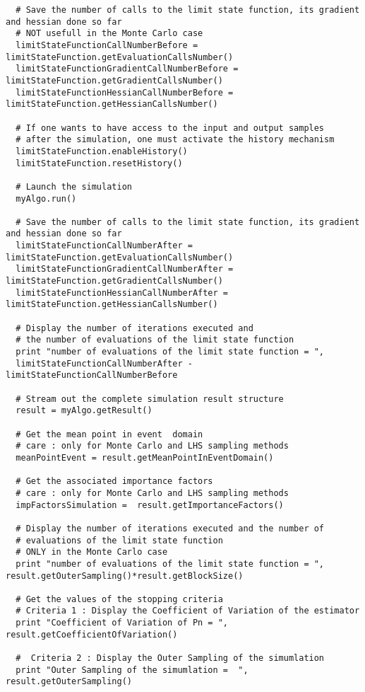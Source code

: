 \begin{lstlisting}
  # Save the number of calls to the limit state function, its gradient and hessian done so far
  # NOT usefull in the Monte Carlo case
  limitStateFunctionCallNumberBefore = limitStateFunction.getEvaluationCallsNumber()
  limitStateFunctionGradientCallNumberBefore = limitStateFunction.getGradientCallsNumber()
  limitStateFunctionHessianCallNumberBefore = limitStateFunction.getHessianCallsNumber()

  # If one wants to have access to the input and output samples
  # after the simulation, one must activate the history mechanism 
  limitStateFunction.enableHistory()
  limitStateFunction.resetHistory()

  # Launch the simulation
  myAlgo.run()

  # Save the number of calls to the limit state function, its gradient and hessian done so far
  limitStateFunctionCallNumberAfter = limitStateFunction.getEvaluationCallsNumber()
  limitStateFunctionGradientCallNumberAfter = limitStateFunction.getGradientCallsNumber()
  limitStateFunctionHessianCallNumberAfter = limitStateFunction.getHessianCallsNumber()

  # Display the number of iterations executed and
  # the number of evaluations of the limit state function
  print "number of evaluations of the limit state function = ",
  limitStateFunctionCallNumberAfter - limitStateFunctionCallNumberBefore

  # Stream out the complete simulation result structure
  result = myAlgo.getResult()

  # Get the mean point in event  domain
  # care : only for Monte Carlo and LHS sampling methods
  meanPointEvent = result.getMeanPointInEventDomain()

  # Get the associated importance factors
  # care : only for Monte Carlo and LHS sampling methods
  impFactorsSimulation =  result.getImportanceFactors()

  # Display the number of iterations executed and the number of
  # evaluations of the limit state function
  # ONLY in the Monte Carlo case
  print "number of evaluations of the limit state function = ", result.getOuterSampling()*result.getBlockSize()

  # Get the values of the stopping criteria
  # Criteria 1 : Display the Coefficient of Variation of the estimator
  print "Coefficient of Variation of Pn = ", result.getCoefficientOfVariation()

  #  Criteria 2 : Display the Outer Sampling of the simumlation
  print "Outer Sampling of the simumlation =  ", result.getOuterSampling()


\end{lstlisting}
